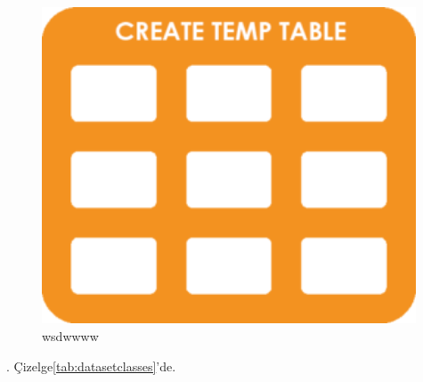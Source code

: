 \lipsum[5-6]

\begin{figure}[ht]
\centering
\includegraphics[width=0.99\textwidth]{gorseller/Temporary-Table.PNG}
\caption{wsdwwww}\label{fig:ckexample}
\end{figure}

\lipsum[6]. Çizelge\ref{tab:datasetclasses}'de.


